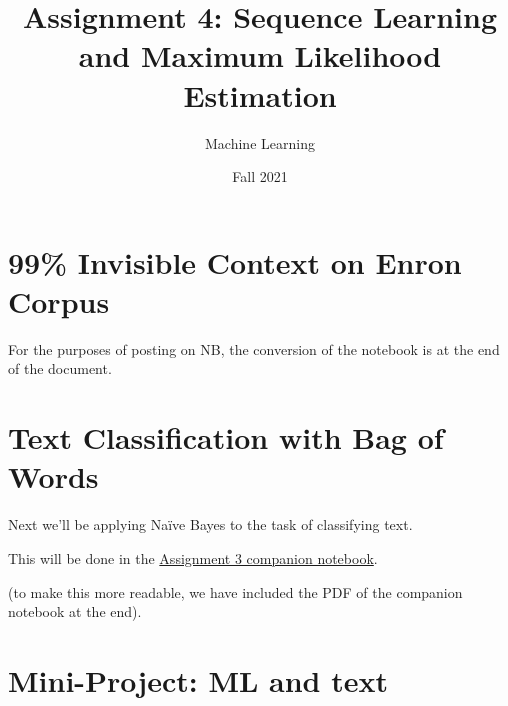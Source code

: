 \documentclass[assignment04_Solutions]{subfiles}
\title{Assignment 4: Sequence Learning and Maximum Likelihood Estimation}
\author{Machine Learning}
\date{Fall 2021}
\begin{document}
\maketitle
\thispagestyle{firstpage}


\begin{learningobjectives}
\bi
\item 
\ei
\end{learningobjectives}

\section{99\% Invisible Context on Enron Corpus}


For the purposes of posting on NB, the conversion of the notebook is at the end of the document.

\section{Text Classification with Bag of Words}
Next we'll be applying Na\"ive Bayes to the task of classifying text.

\begin{externalresources}[(60 minutes)]
This will be done in the \href{https://colab.research.google.com/github/mlfa19/assignments/blob/master/Module\%202/03/Assignment_3_Companion_Notebook.ipynb}{Assignment 3 companion notebook}.
\end{externalresources}

(to make this more readable, we have included the PDF of the companion notebook at the end).




\section{Mini-Project: ML and text}

\end{document}
